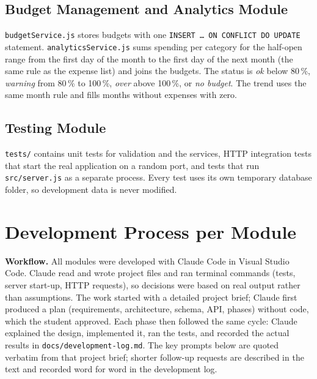 \documentclass[11pt,a4paper]{article}
\begin{document}
\subsection{Budget Management and Analytics Module}

\texttt{budgetService.js} stores budgets with one
\texttt{INSERT \ldots{} ON CONFLICT DO UPDATE} statement.
\texttt{analyticsService.js} sums spending per category for the
half-open range from the first day of the month to the first day of the
next month (the same rule as the expense list) and joins the budgets.
The status is \emph{ok} below 80\,\%, \emph{warning} from 80\,\% to
100\,\%, \emph{over} above 100\,\%, or \emph{no budget}. The trend uses
the same month rule and fills months without expenses with zero.

\subsection{Testing Module}

\texttt{tests/} contains unit tests for validation and the services, HTTP
integration tests that start the real application on a random port, and
tests that run \texttt{src/server.js} as a separate process. Every test
uses its own temporary database folder, so development data is never
modified.


\section{Development Process per Module}

\textbf{Workflow.} All modules were developed with Claude Code in Visual
Studio Code. Claude read and wrote project files and ran terminal
commands (tests, server start-up, HTTP requests), so decisions were based
on real output rather than assumptions. The work started with a detailed
project brief; Claude first produced a plan (requirements, architecture,
schema, API, phases) without code, which the student approved. Each
phase then followed the same cycle: Claude explained the design,
implemented it, ran the tests, and recorded the actual results in
\texttt{docs/development-log.md}. The key prompts below are quoted
verbatim from that project brief; shorter follow-up requests are
described in the text and recorded word for word in the development log.
\end{document}
